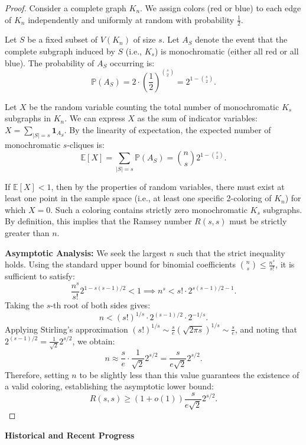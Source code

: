 \documentclass[11pt, a4paper]{ctexrep}
\begin{document}
\begin{proof}
    Consider a complete graph $K_n$. We assign colors (red or blue) to each edge of $K_n$ independently and uniformly at random with probability $\frac{1}{2}$.

    Let $S$ be a fixed subset of $V(K_n)$ of size $s$. Let $A_S$ denote the event that the complete subgraph induced by $S$ (i.e., $K_s$) is monochromatic (either all red or all blue). The probability of $A_S$ occurring is:
    $$ \mathbb{P}(A_S) = 2 \cdot \left(\frac{1}{2}\right)^{\binom{s}{2}} = 2^{1 - \binom{s}{2}}. $$

    Let $X$ be the random variable counting the total number of monochromatic $K_s$ subgraphs in $K_n$. We can express $X$ as the sum of indicator variables: $X = \sum_{|S|=s} \mathbf{1}_{A_S}$.
    By the linearity of expectation, the expected number of monochromatic $s$-cliques is:
    $$ \mathbb{E}[X] = \sum_{|S|=s} \mathbb{P}(A_S) = \binom{n}{s} 2^{1 - \binom{s}{2}}. $$

    If $\mathbb{E}[X] < 1$, then by the properties of random variables, there must exist at least one point in the sample space (i.e., at least one specific 2-coloring of $K_n$) for which $X = 0$. Such a coloring contains strictly zero monochromatic $K_s$ subgraphs. By definition, this implies that the Ramsey number $R(s, s)$ must be strictly greater than $n$.

    \textbf{Asymptotic Analysis:} We seek the largest $n$ such that the strict inequality holds. Using the standard upper bound for binomial coefficients $\binom{n}{s} \le \frac{n^s}{s!}$, it is sufficient to satisfy:
    $$ \frac{n^s}{s!} 2^{1 - s(s-1)/2} < 1 \implies n^s < s! \cdot 2^{s(s-1)/2 - 1}. $$
    Taking the $s$-th root of both sides gives:
    $$ n < (s!)^{1/s} \cdot 2^{(s-1)/2} \cdot 2^{-1/s}. $$
    Applying Stirling's approximation $(s!)^{1/s} \sim \frac{s}{e} (\sqrt{2\pi s})^{1/s} \sim \frac{s}{e}$, and noting that $2^{(s-1)/2} = \frac{1}{\sqrt{2}} 2^{s/2}$, we obtain:
    $$ n \approx \frac{s}{e} \cdot \frac{1}{\sqrt{2}} 2^{s/2} = \frac{s}{e\sqrt{2}} 2^{s/2}. $$
    Therefore, setting $n$ to be slightly less than this value guarantees the existence of a valid coloring, establishing the asymptotic lower bound:
    $$ R(s, s) \ge (1 + o(1)) \frac{s}{e\sqrt{2}} 2^{s/2}. $$
\end{proof}

\textbf{Historical and Recent Progress}
\end{document}
